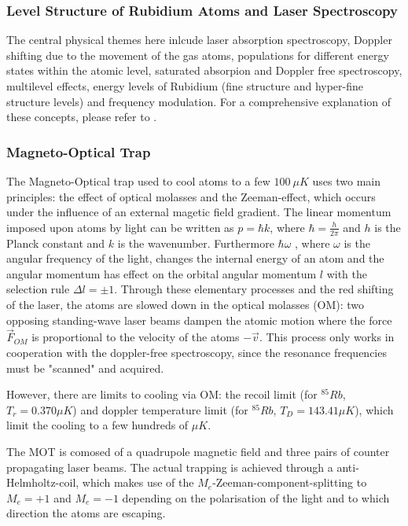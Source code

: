 \documentclass[12pt, a4paper]{article}
\begin{document}
\subsubsection{Level Structure of Rubidium Atoms and Laser Spectroscopy}
The central physical themes here inlcude laser absorption spectroscopy, Doppler shifting due to the movement of the gas atoms, populations for different energy states within the atomic level, saturated absorpion and Doppler free spectroscopy, multilevel effects, energy levels of Rubidium (fine structure and hyper-fine structure levels) and frequency modulation. For a comprehensive explanation of these concepts, please refer to \cite{script}.
\subsubsection{Magneto-Optical Trap}
The Magneto-Optical trap used to cool atoms to a few $100\ \mu  K$ uses two main principles: the effect of optical molasses and the Zeeman-effect, which occurs under the influence of an external magetic field gradient. The linear momentum imposed upon atoms by light can be written as $p=\hbar k$, where $\hbar=\frac{h}{2\pi}$ and $h$ is the Planck constant and $k$ is the wavenumber. Furthermore $\hbar \omega$ , where $\omega$ is the angular frequency of the light, changes the internal energy of an atom and the angular momentum has effect on the orbital angular momentum $l$ with the selection rule $\Delta l=\pm 1$. Through these elementary processes and the red shifting of the laser, the atoms are slowed down in the optical molasses (OM): two opposing standing-wave laser beams dampen the atomic motion where the force $\vec{F}_{OM}$ is proportional to the velocity of the atoms $-\vec{v}$. This process only works in cooperation with the doppler-free spectroscopy, since the resonance frequencies must be "scanned" and acquired.

However, there are limits to cooling via OM: the recoil limit (for $^{85}Rb$, $T_r = 0.370\mu K$) and doppler temperature limit (for $^{85}Rb$, $T_D = 143.41\mu K$), which limit the cooling to a few hundreds of $\mu K$.

The MOT is comosed of a quadrupole magnetic field and three pairs of counter propagating laser beams.
The actual trapping is achieved through a anti-Helmholtz-coil, which makes use of the $M_e$-Zeeman-component-splitting to $M_e = +1$ and $M_e = -1$ depending on the polarisation of the light and to which direction the atoms are escaping.
\end{document}
